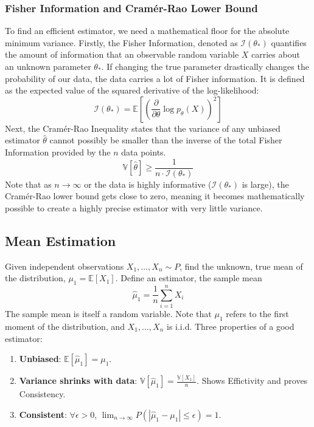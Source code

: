 \documentclass[../Probability.tex]{subfiles}
\begin{document}
\subsubsection{Fisher Information and Cramér-Rao Lower Bound}
To find an efficient estimator, we need a mathematical floor for the absolute minimum variance.\newline
Firstly, the Fisher Information, denoted as $\mathcal{I}(\theta_*)$ quantifies the amount of information that an observable random variable $X$ carries about an unknown parameter $\theta_*$.\newline
If changing the true parameter drastically changes the probability of our data, the data carries a lot of Fisher information.\newline
It is defined as the expected value of the squared derivative of the log-likelihood:
$$\mathcal{I}(\theta_*) = \mathbb{E} \left[ \left( \frac{\partial}{\partial \theta} \log p_\theta(X) \right)^2 \right]$$
Next, the Cramér-Rao Inequality states that the variance of any unbiased estimator $\hat{\theta}$ cannot possibly be smaller than the inverse of the total Fisher Information provided by the $n$ data points.
$$\mathbb{V}[\hat{\theta}] \ge \frac{1}{n \cdot \mathcal{I}(\theta_*)}$$
Note that as $n \to \infty$ or the data is highly informative ($\mathcal{I}(\theta_*)$ is large), the Cramér-Rao lower bound gets close to zero, meaning it becomes mathematically possible to create a highly precise estimator with very little variance.

\subsection{Mean Estimation}
Given independent observations $X_1, \ldots, X_n \sim P$, find the unknown, true mean of the distribution, $\mu_1 = \mathbb{E}[X_1]$.\newline
Define an estimator, the sample mean
\[\hat{\mu}_1 = \frac{1}{n} \sum_{i=1}^n X_i\]
The sample mean is itself a random variable.\newline
Note that $\mu_1$ refers to the first moment of the distribution, and $X_1, \ldots, X_n$ is i.i.d.\newline
Three properties of a good estimator:
\begin{enumerate}
    \item \textbf{Unbiased}: $\mathbb{E}[\hat{\mu}_{1}]=\mu_{1}$.
    \item \textbf{Variance shrinks with data}: $\mathbb{V}[\hat{\mu}_{1}]=\frac{\mathbb{V}[X_{1}]}{n}$. Shows Effictivity and proves Consistency.
    \item \textbf{Consistent}: $\forall\epsilon>0$, $\lim_{n\rightarrow\infty}P(|\hat{\mu}_{1}-\mu_{1}|\le\epsilon)=1$.
\end{enumerate}
\end{document}
